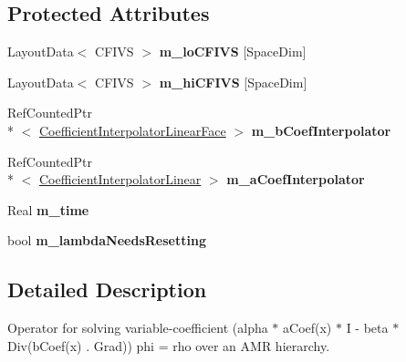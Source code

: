 \subsection*{Protected Attributes}
\begin{DoxyCompactItemize}
\item 
\hypertarget{class_a_m_r_liquid_conc_op_a7a4be2cdfec039bb89191424b87b615a}{Layout\-Data$<$ C\-F\-I\-V\-S $>$ {\bfseries m\-\_\-lo\-C\-F\-I\-V\-S} \mbox{[}Space\-Dim\mbox{]}}\label{class_a_m_r_liquid_conc_op_a7a4be2cdfec039bb89191424b87b615a}

\item 
\hypertarget{class_a_m_r_liquid_conc_op_a9858defd72882a14245aa26d095b808f}{Layout\-Data$<$ C\-F\-I\-V\-S $>$ {\bfseries m\-\_\-hi\-C\-F\-I\-V\-S} \mbox{[}Space\-Dim\mbox{]}}\label{class_a_m_r_liquid_conc_op_a9858defd72882a14245aa26d095b808f}

\item 
\hypertarget{class_a_m_r_liquid_conc_op_a6a28ffabc6f982fe703b452a092ff511}{Ref\-Counted\-Ptr\\*
$<$ \hyperlink{class_coefficient_interpolator_linear_face}{Coefficient\-Interpolator\-Linear\-Face} $>$ {\bfseries m\-\_\-b\-Coef\-Interpolator}}\label{class_a_m_r_liquid_conc_op_a6a28ffabc6f982fe703b452a092ff511}

\item 
\hypertarget{class_a_m_r_liquid_conc_op_ab6d2db1ad554234241f2f6af62b2f5b2}{Ref\-Counted\-Ptr\\*
$<$ \hyperlink{class_coefficient_interpolator_linear}{Coefficient\-Interpolator\-Linear} $>$ {\bfseries m\-\_\-a\-Coef\-Interpolator}}\label{class_a_m_r_liquid_conc_op_ab6d2db1ad554234241f2f6af62b2f5b2}

\item 
\hypertarget{class_a_m_r_liquid_conc_op_a0a23341e02cc5c4feb1f08482cbacfbb}{Real {\bfseries m\-\_\-time}}\label{class_a_m_r_liquid_conc_op_a0a23341e02cc5c4feb1f08482cbacfbb}

\item 
\hypertarget{class_a_m_r_liquid_conc_op_a8f95aec9c75f7cf0e55082533f3d6baa}{bool {\bfseries m\-\_\-lambda\-Needs\-Resetting}}\label{class_a_m_r_liquid_conc_op_a8f95aec9c75f7cf0e55082533f3d6baa}

\end{DoxyCompactItemize}


\subsection{Detailed Description}
Operator for solving variable-\/coefficient (alpha $\ast$ a\-Coef(x) $\ast$ I -\/ beta $\ast$ Div(b\-Coef(x) . Grad)) phi = rho over an A\-M\-R hierarchy. 

